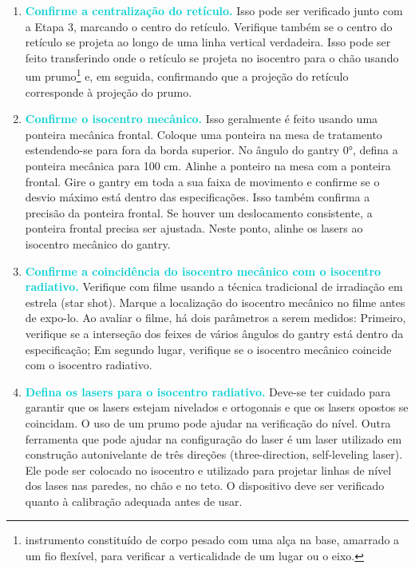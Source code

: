 \documentclass[11pt,a4paper]{article}
\begin{document}
\begin{enumerate}[label=\textcolor{CarnationPink}{\arabic*${}^\circ $}]
		\item \textcolor{DarkTurquoise}{\textbf{Confirme a centralização do retículo.}} Isso pode ser verificado junto com a Etapa 3, marcando o centro do retículo. Verifique também se o centro do retículo se projeta ao longo de uma linha vertical verdadeira. Isso pode ser feito transferindo onde o retículo se projeta no isocentro para o chão usando um prumo\footnote{instrumento constituído de corpo pesado com uma alça na base, amarrado a um fio flexível, para verificar a verticalidade de um lugar ou o eixo.} e, em seguida, confirmando que a projeção do retículo corresponde à projeção do prumo.
	
		\item \textcolor{DarkTurquoise}{\textbf{Confirme o isocentro mecânico.}} Isso geralmente é feito usando uma ponteira mecânica frontal. Coloque uma ponteira na mesa de tratamento estendendo-se para fora da borda superior. No ângulo do gantry \ang{0}, defina a ponteira mecânica para 100 cm. Alinhe a ponteiro na mesa com a ponteira frontal. Gire o gantry em toda a sua faixa de movimento e confirme se o desvio máximo está dentro das especificações. Isso também confirma a precisão da ponteira frontal. Se houver um deslocamento consistente, a ponteira frontal precisa ser ajustada. Neste ponto, alinhe os lasers ao isocentro mecânico do gantry.
		
		\item \textcolor{DarkTurquoise}{\textbf{Confirme a coincidência do isocentro mecânico com o isocentro radiativo.}} Verifique com filme usando a técnica tradicional de irradiação em estrela (star shot). Marque a localização do isocentro mecânico no filme antes de expo-lo. Ao avaliar o filme, há dois parâmetros a serem medidos: Primeiro, verifique se a interseção dos feixes de vários ângulos do gantry está dentro da especificação; Em segundo lugar, verifique se o isocentro mecânico coincide com o isocentro radiativo.
		
		\item \textcolor{DarkTurquoise}{\textbf{Defina os lasers para o isocentro radiativo.}} Deve-se ter cuidado para garantir que os lasers estejam nivelados e ortogonais e que os lasers opostos se coincidam. O uso de um prumo pode ajudar na verificação do nível. Outra ferramenta que pode ajudar na configuração do laser é um laser utilizado em construção autonivelante de três direções (three-direction, self-leveling laser). Ele pode ser colocado no isocentro e utilizado para projetar linhas de nível dos lases nas paredes, no chão e no teto. O dispositivo deve ser verificado quanto à calibração adequada antes de usar.
		

\end{enumerate}
\end{document}
